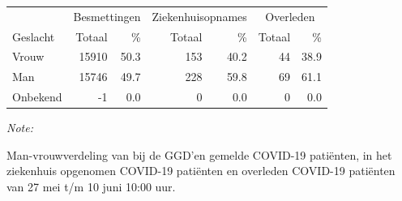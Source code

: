 \documentclass[
  english,
  man,floatsintext]{apa6}
\begin{document}
\begin{table}
\centering\begingroup\fontsize{11}{13}\selectfont

\begin{threeparttable}
\begin{tabular}{lrrrrrr}
\toprule
\multicolumn{1}{c}{ } & \multicolumn{2}{c}{Besmettingen} & \multicolumn{2}{c}{Ziekenhuisopnames} & \multicolumn{2}{c}{Overleden} \\
\cmidrule(l{3pt}r{3pt}){2-3} \cmidrule(l{3pt}r{3pt}){4-5} \cmidrule(l{3pt}r{3pt}){6-7}
Geslacht & Totaal & \% & Totaal & \% & Totaal & \%\\
\midrule
Vrouw & 15910 & 50.3 & 153 & 40.2 & 44 & 38.9\\
Man & 15746 & 49.7 & 228 & 59.8 & 69 & 61.1\\
Onbekend & -1 & 0.0 & 0 & 0.0 & 0 & 0.0\\
\bottomrule
\end{tabular}
\begin{tablenotes}
\item \textit{Note: } 
\item Man-vrouwverdeling van bij de GGD’en gemelde COVID-19 patiënten, in het ziekenhuis opgenomen COVID-19 patiënten en overleden COVID-19 patiënten van 27 mei t/m 10 juni 10:00 uur.
\end{tablenotes}
\end{threeparttable}
\endgroup{}
\end{table}
\newpage
\end{document}
